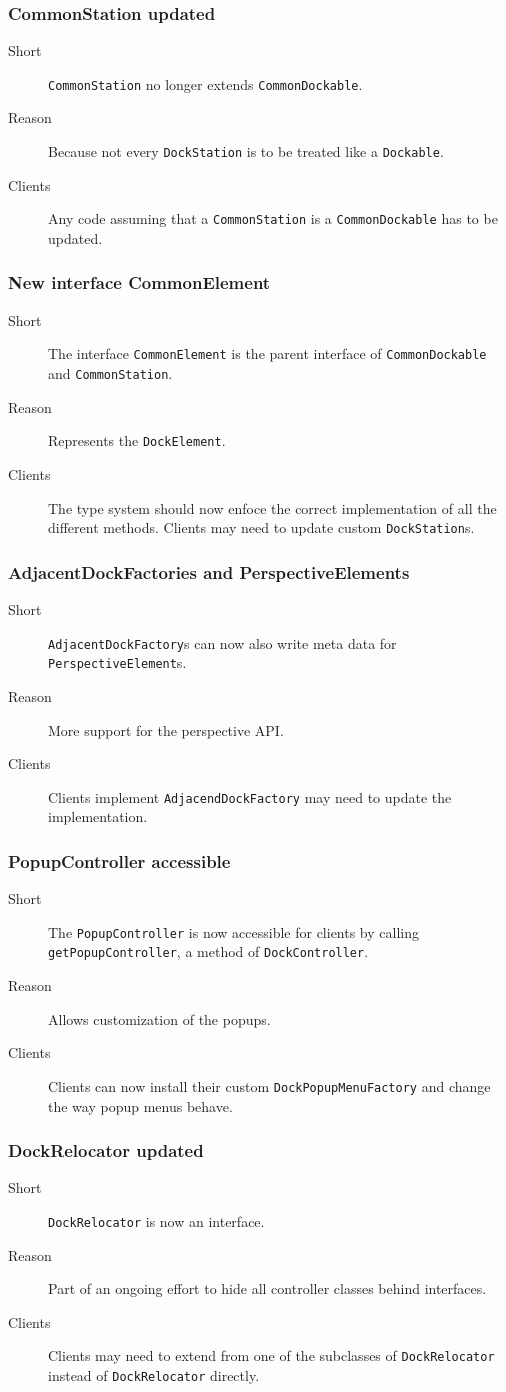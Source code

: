 \documentclass[a4paper,10pt]{article}
\newcommand{\src}[1]{\lstinline[basicstyle=\normalsize\ttfamily,keywordstyle=\normalsize\ttfamily,identifierstyle=\normalsize\ttfamily]|#1|}
\newcommand{\short}{\item[Short]}
\newcommand{\why}{\item[Reason]}
\newcommand{\clients}{\item[Clients]}
\begin{document}
\subsubsection{CommonStation updated}
\begin{description}
 \short \src{CommonStation} no longer extends \src{CommonDockable}.
 \why Because not every \src{DockStation} is to be treated like a \src{Dockable}.
 \clients Any code assuming that a \src{CommonStation} is a \src{CommonDockable} has to be updated.
\end{description}

\subsubsection{New interface CommonElement}
\begin{description}
 \short The interface \src{CommonElement} is the parent interface of \src{CommonDockable} and \src{CommonStation}.
 \why Represents the \src{DockElement}.
 \clients The type system should now enfoce the correct implementation of all the different methods. Clients may need to update custom \src{DockStation}s.
\end{description}

\subsubsection{AdjacentDockFactories and PerspectiveElements}
\begin{description}
 \short \src{AdjacentDockFactory}s can now also write meta data for \linebreak \src{PerspectiveElement}s.
 \why More support for the perspective API.
 \clients Clients implement \src{AdjacendDockFactory} may need to update the implementation.
\end{description}

\subsubsection{PopupController accessible}
\begin{description}
 \short The \src{PopupController} is now accessible for clients by calling \linebreak \src{getPopupController}, a method of \src{DockController}.
 \why Allows customization of the popups.
 \clients Clients can now install their custom \src{DockPopupMenuFactory} and change the way popup menus behave.
\end{description}

\subsubsection{DockRelocator updated}
\begin{description}
 \short \src{DockRelocator} is now an interface.
 \why Part of an ongoing effort to hide all controller classes behind interfaces.
 \clients Clients may need to extend from one of the subclasses of \src{DockRelocator} instead of \src{DockRelocator} directly.
\end{description}
\end{document}
